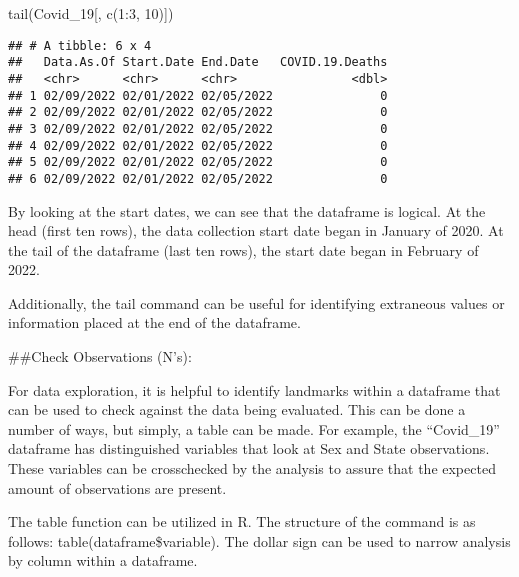 \documentclass[
]{article}
\newenvironment{Shaded}{\begin{snugshade}}{\end{snugshade}}
\newcommand{\DecValTok}[1]{\textcolor[rgb]{0.00,0.00,0.81}{#1}}
\newcommand{\FunctionTok}[1]{\textcolor[rgb]{0.00,0.00,0.00}{#1}}
\newcommand{\NormalTok}[1]{#1}
\newcommand{\SpecialCharTok}[1]{\textcolor[rgb]{0.00,0.00,0.00}{#1}}
\begin{document}
\begin{Shaded}
\begin{Highlighting}[]
\FunctionTok{tail}\NormalTok{(Covid\_19[, }\FunctionTok{c}\NormalTok{(}\DecValTok{1}\SpecialCharTok{:}\DecValTok{3}\NormalTok{, }\DecValTok{10}\NormalTok{)])}
\end{Highlighting}
\end{Shaded}

\begin{verbatim}
## # A tibble: 6 x 4
##   Data.As.Of Start.Date End.Date   COVID.19.Deaths
##   <chr>      <chr>      <chr>                <dbl>
## 1 02/09/2022 02/01/2022 02/05/2022               0
## 2 02/09/2022 02/01/2022 02/05/2022               0
## 3 02/09/2022 02/01/2022 02/05/2022               0
## 4 02/09/2022 02/01/2022 02/05/2022               0
## 5 02/09/2022 02/01/2022 02/05/2022               0
## 6 02/09/2022 02/01/2022 02/05/2022               0
\end{verbatim}

By looking at the start dates, we can see that the dataframe is logical.
At the head (first ten rows), the data collection start date began in
January of 2020. At the tail of the dataframe (last ten rows), the start
date began in February of 2022.

Additionally, the tail command can be useful for identifying extraneous
values or information placed at the end of the dataframe.

\#\#Check Observations (N's):

For data exploration, it is helpful to identify landmarks within a
dataframe that can be used to check against the data being evaluated.
This can be done a number of ways, but simply, a table can be made. For
example, the ``Covid\_19'' dataframe has distinguished variables that
look at Sex and State observations. These variables can be crosschecked
by the analysis to assure that the expected amount of observations are
present.

The table function can be utilized in R. The structure of the command is
as follows: table(dataframe\$variable). The dollar sign can be used to
narrow analysis by column within a dataframe.

\begin{Shaded}
\end{Shaded}
\end{document}
